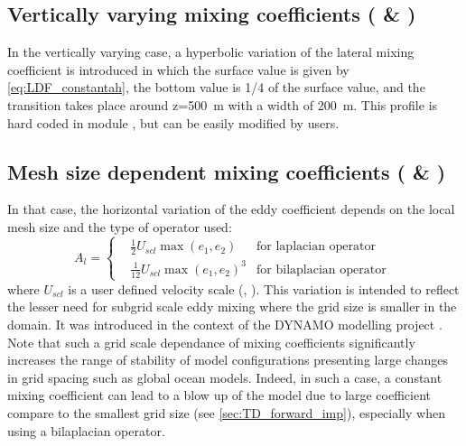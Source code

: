 \documentclass[../main/NEMO_manual]{subfiles}
\begin{document}
\subsection[Vertically varying mixing coefficients (\forcode{=10})]{Vertically varying mixing coefficients (\protect{} \& \protect{})}

In the vertically varying case, a hyperbolic variation of the lateral mixing coefficient is introduced in which
the surface value is given by \autoref{eq:LDF_constantah}, the bottom value is 1/4 of the surface value,
and the transition takes place around z=500~m with a width of 200~m.
This profile is hard coded in module , but can be easily modified by users.

\subsection[Mesh size dependent mixing coefficients (\forcode{=20})]{Mesh size dependent mixing coefficients (\protect{} \& \protect{})}

In that case, the horizontal variation of the eddy coefficient depends on the local mesh size and
the type of operator used:
\begin{equation}
  \label{eq:LDF_title}
  A_l = \left\{
    \begin{aligned}
      & \frac{1}{2} U_{scl}  \max(e_1,e_2)  			& \text{for laplacian operator } \\
      & \frac{1}{12} U_{scl}  \max(e_1,e_2)^{3}             & \text{for bilaplacian operator }
    \end{aligned}
  \right.
\end{equation}
where $U_{scl}$ is a user defined velocity scale (, ).
This variation is intended to reflect the lesser need for subgrid scale eddy mixing where
the grid size is smaller in the domain.
It was introduced in the context of the DYNAMO modelling project \citep{willebrand.barnier.ea_PO01}.
Note that such a grid scale dependance of mixing coefficients significantly increases the range of stability of
model configurations presenting large changes in grid spacing such as global ocean models.
Indeed, in such a case, a constant mixing coefficient can lead to a blow up of the model due to
large coefficient compare to the smallest grid size (see \autoref{sec:TD_forward_imp}),
especially when using a bilaplacian operator.
\end{document}
